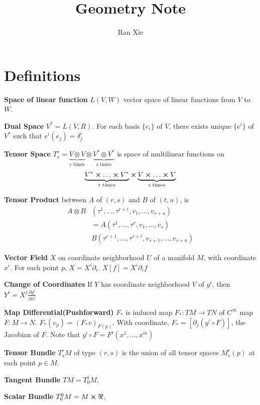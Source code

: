 \documentclass[12pt]{article}
\title{Geometry Note}
\author{Ran Xie}
\begin{document}
\maketitle

\section{Definitions}

\textbf{Space of linear function} $L(V, W)$ vector space of linear functions from $V$ to $W$.

\textbf{Dual Space} $V^* = L(V, R)$. For each basis $\{e_i\}$ of $V$, there exists unique $\{e^i\}$ of $V^*$ such that $e^i (e_j) = \delta^i_j$

\textbf{Tensor Space} $T^r_s = \underbrace{V \otimes V}_\text{r times} \otimes \underbrace{V^* \otimes V^*}_\text{s times}  $  is space of multilinear functions on $$\underbrace{V^* \cross \ldots \cross V^*}_\text{r times} \cross \underbrace{V \cross \ldots \cross V}_\text{s times}$$

\textbf{Tensor Product} between $A$ of $(r,s)$ and $B$ of $(t, u)$,  is $$\begin{aligned}  A \otimes B &(\tau^1,\ldots, \tau^{r+t}, v_1,\ldots, v_{s+u}) \\ & = A(\tau^1, \ldots, \tau^r, v_1, \ldots, v_s) \\ &B(\tau^{r+1}, \ldots , \tau^{r+t}, v_{s+1}, \ldots, v_{s+u})\end{aligned}$$

\textbf{Vector Field} $X$ on coordinate neighborhood $U$ of a manifold $M$,  with coordinate $x^i$. For each point $p$, $X = X^i \partial_i$.  $X[f] = X^i \partial_i f$

\textbf{Change of Coordinates} If $Y$ has coordinate neighborhood $V$ of $y^i$, then $Y^i = X^j \frac{\partial y^i }{\partial x^j}$

\textbf{Map Differential(Pushforward)} $F_*$ is induced map $F_*: TM \rightarrow TN$ of $C^\infty$ map $F: M\rightarrow N$. $F_* (v_p) = (F_*v)_{F(p)}$. With coordinate, $F_* = [ \partial_j ( y^i \circ F ) ]$, the Jacobian of $F$. Note that $y^i \circ F = F^i(x^1, \ldots, x^m)$

\textbf{Tensor Bundle} $T^r_s M$  of type $(r,s)$ is the union of all tensor spaces $M^r_s(p)$ at each point $p \in M$.  

\textbf{Tangent Bundle} $TM=T^1_0M$, 

\textbf{Scalar Bundle} $T^0_0M = M \cross \real$, 
\end{document}
